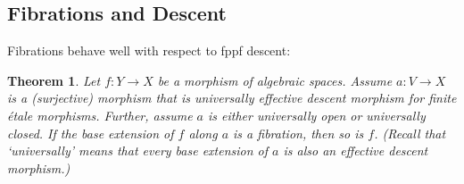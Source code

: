 \documentclass{amsart}
\newtheorem{thm}{Theorem}[section]
\theoremstyle{definition}
\theoremstyle{remark}
\theoremstyle{remark}
\let\:=\colon
\begin{document}
\subsection{Fibrations and Descent}

Fibrations behave well with respect to fppf descent:

\begin{thm}{\label{T:descent}}
Let $f \: Y \to X$ be a morphism of algebraic spaces. Assume $a \:
V \to X$ is a (surjective) morphism that is universally effective
descent morphism for finite \'{e}tale morphisms. Further, assume
$a$ is either universally open or universally closed. If the base
extension of $f$ along $a$  is a fibration, then so is $f$.
(Recall that  `universally'  means that every base extension of
$a$ is also an effective descent morphism.)
\end{thm}
\end{document}

